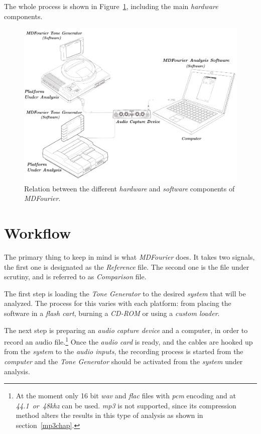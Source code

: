 \documentclass[10pt,a4paper]{report}
\newcommand{\ac}[1]{\textit{\mbox{\acrshort{#1}}}}
\newcommand{\khz}[1]{\textit{\mbox{#1\acrshort{khz}}}}
\begin{document}
The whole process is shown in Figure~\ref{fig:mdfourierworkflow}, including the main \textit{hardware} components.

\begin{figure}[H]
	\centering
	\includegraphics[width=0.8\linewidth]{images/howitworks/MDFourierWorkFlow.png}
	\caption[Workflow]{Relation between the different \textit{hardware} and \textit{software} components of \textit{MDFourier}.}
	\label{fig:mdfourierworkflow}
\end{figure}

\section{Workflow}

The primary thing to keep in mind is what \textit{MDFourier} does. It takes two signals, the first one is designated as the \textit{Reference} file. The second one is the file under scrutiny, and is referred to as \textit{Comparison} file. 

The first step is loading the \textit{Tone Generator} to the desired \textit{system} that will be analyzed. The process for this varies with each platform: from placing the software in a \textit{flash cart}, burning a \textit{CD-ROM} or using a \textit{custom loader}.

The next step is preparing an \textit{audio capture device} and a computer, in order to record an audio file.\footnote{At the moment only 16 bit \ac{wav} and \ac{flac} files with \ac{pcm} encoding and at \khz{44.1 or 48} can be used. \ac{mp3} is not supported, since its compression method alters the results in this type of analysis as shown in section~\ref{mp3chap}.} Once the \textit{audio card} is ready, and the cables are hooked up from the \textit{system} to the \textit{audio inputs}, the recording process is started from the \textit{computer} and the \textit{Tone Generator} should be activated from the \textit{system} under analysis.
\end{document}
